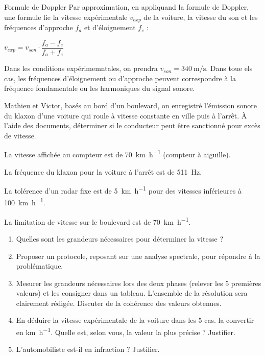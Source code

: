 \documentclass[a4paper,12pt]{scrartcl}
\begin{document}
\begin{documentboxenv}{Formule de Doppler}
    Par approximation, en appliquand la formule de Doppler, une formule lie la vitesse expérimentale $v_{exp}$ de la voiture, la vitesse du son et les fréquences d'approche $f_a$ et d'éloignement $f_e$ :
    \begin{center}
        $v_{exp} = v_{son}\cdot \dfrac{f_a - f_e}{f_a + f_e}$
    \end{center}
    Dans les conditions expérimemntales, on prendra $v_{son} = \SI{340}{\meter\per\second}$.
    Dans toue els cas, les fréquences d'éloignement ou d'approche peuvent correspondre à la fréquence fondamentale ou les harmoniques du signal sonore.\\
\end{documentboxenv}

\begin{problematique}
    Mathieu et Victor, basés au bord d'un boulevard, on enregistré l'émission sonore du klaxon d'une voiture qui roule à vitesse constante en ville puis à l'arrêt. À l'aide des documents, déterminer si le conducteur peut être sanctionné pour excès de vitesse.\\
\end{problematique}

\begin{data}
    \begin{itemize*}
        \item La vitesse affichée au compteur est de \SI{70}{\kilo\meter\per\hour} (compteur à aiguille).
        \item La fréquence du klaxon pour la voiture à l'arrêt est de \SI{511}{\hertz}.
        \item La tolérence d'un radar fixe est de \SI{5}{\kilo\meter\per\hour} pour des vitesses inférieures à \SI{100}{\kilo\meter\per\hour}.
        \item La limitation de vitesse sur le boulevard est de \SI{70}{\kilo\meter\per\hour}.
    \end{itemize*}
\end{data}

\begin{question}
    \begin{enumerate}
        \item Quelles sont les grandeurs nécessaires pour déterminer la vitesse ?
        \item Proposer un protocole, reposant sur une analyse spectrale, pour répondre à la problématique.
        \item Mesurer les grandeurs nécessaires lors des deux phases (relever les 5 premières valeurs) et les consigner dans un tableau. L'ensemble de la résolution sera clairement rédigée. Discuter de la cohérence des valeurs obtenues.
        \item En déduire la vitesse expérimentale de la voiture dans les 5 cas. la convertir en \unit{\kilo\meter\per\hour}. Quelle est, selon vous, la valeur la plus précise ? Justifier.
        \item L'automobiliste est-il en infraction ? Justifier.
    \end{enumerate}
\end{question}
\end{document}
